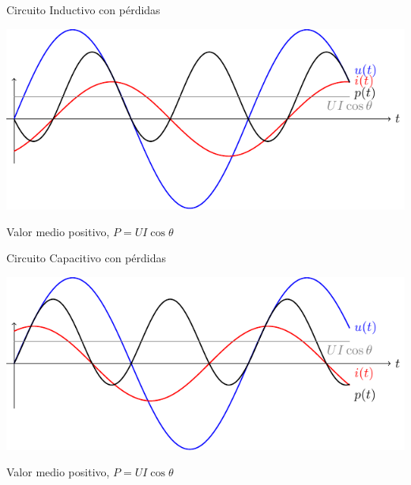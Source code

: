 \documentclass[xcolor={usenames,svgnames,dvipsnames}]{beamer}
\begin{document}
\begin{frame}[label={sec:org6517896}]{Circuito Inductivo con pérdidas}
\begin{center}
\includegraphics[width=.9\linewidth]{figs/inductivoPotencia.pdf}
\end{center}

\begin{center}
Valor medio positivo, \(P = U I \cos \theta\)
\end{center}
\end{frame}


\begin{frame}[label={sec:org081a248}]{Circuito Capacitivo con pérdidas}
\begin{center}
\includegraphics[width=.9\linewidth]{figs/capacitivoPotencia.pdf}
\end{center}

\begin{center}
Valor medio positivo, \(P = U I \cos \theta\)
\end{center}
\end{frame}
\end{document}
